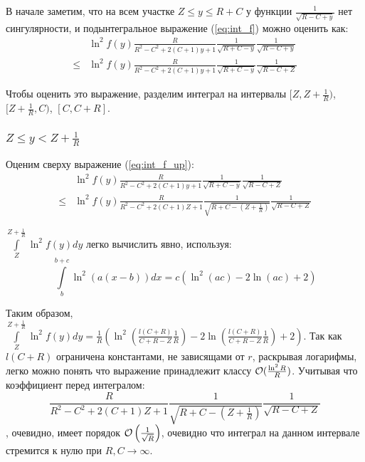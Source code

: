 В начале заметим, что на всем участке $Z \le y \le R + C$ у функции $\frac{1}{\sqrt{R - C + y}}$ нет сингулярности, и подынтегральное выражение (\ref{eq:int_f}) можно оценить как:
\begin{equation}\label{eq:int_f_up}
\begin{aligned}
       & \ln^2 f(y) \frac{R}{R^2 - C^2 + 2 (C + 1) y + 1} \frac{1}{\sqrt{R + C - y}} \frac{1}{\sqrt{R - C + y}}
\\ \le & \ln^2 f(y) \frac{R}{R^2 - C^2 + 2 (C + 1) y + 1} \frac{1}{\sqrt{R + C - y}} \frac{1}{\sqrt{R - C + Z}}
\end{aligned}
\end{equation}

Чтобы оценить это выражение, разделим интеграл на интервалы $[Z, Z + \frac{1}{R})$, $[Z + \frac{1}{R}, C)$, $[C, C + R]$.

\subsubsection{$Z \le y < Z + \frac{1}{R}$}

Оценим сверху выражение (\ref{eq:int_f_up}):
\begin{align*}
       & \ln^2 f(y) \frac{R}{R^2 - C^2 + 2 (C + 1) y + 1} \frac{1}{\sqrt{R + C - y}} \frac{1}{\sqrt{R - C + Z}}
\\ \le & \ln^2 f(y) \frac{R}{R^2 - C^2 + 2 (C + 1) Z + 1} \frac{1}{\sqrt{R + C - (Z + \frac{1}{R})}} \frac{1}{\sqrt{R - C + Z}}
\end{align*}

$\int\limits_{Z}^{Z + \frac{1}{R}} \ln^2 f(y) dy$ легко вычислить явно, используя:
\[
    \int\limits_b^{b + c} \ln^2 (a (x - b)) dx = c (\ln^2(a c) - 2 \ln (a c) + 2)
\]

Таким образом, $\int\limits_{Z}^{Z + \frac{1}{R}} \ln^2 f(y) dy = \frac{1}{R} ( \ln^2 (\frac{l(C + R)}{C + R - Z} \frac{1}{R}) - 2 \ln (\frac{l(C + R)}{C + R - Z} \frac{1}{R}) + 2)$. Так как $l(C + R)$ ограничена константами, не зависящами от $r$, раскрывая логарифмы, легко можно понять что выражение принадлежит классу $\mathcal{O}(\frac{\ln^2 R}{R})$. Учитывая что коэффициент перед интегралом:
\[
\frac{R}{R^2 - C^2 + 2 (C + 1) Z + 1} \frac{1}{\sqrt{R + C - (Z + \frac{1}{R})}} \frac{1}{\sqrt{R - C + Z}}
\]
, очевидно, имеет порядок $\mathcal{O}\left(\frac{1}{\sqrt{R}}\right)$, очевидно что интеграл на данном интервале стремится к нулю при $R, C \to \infty$.

